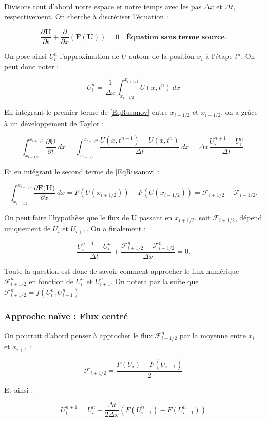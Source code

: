 \documentclass[
11pt, %
francais, %
singlespacing, %
headsepline, %
]{MastersDoctoralThesis} %
\theoremstyle{definition}
\begin{document}
Divisons tout d'abord notre espace et notre temps avec les pas $\Delta x$ et $\Delta t$, respectivement. On cherche à discrétiser l'équation : 

$$\frac{\partial\textbf{U}}{\partial t}+\frac{\partial}{\partial x}(\textbf{F} (\textbf{U})) = 0 \quad \textbf{Équation sans terme source} \label{EqRusanov} .$$

On pose ainsi $U_i ^n$ l'approximation de $U$ autour de la position $x_i$ à l'étape $t^n$. On peut donc noter :

$$ U_i ^n = \frac{1}{\Delta x}\int_{x_{i-1/2}}^{x_{i+1/2}} U(x,t^n) \ dx $$

En intégrant le premier terme de \ref{EqRusanov} entre $x_{i-1/2}$ et $x_{i+1/2}$, on a grâce à un développement de Taylor :

$$ \int_{x_{i-1/2}}^{x_{i+1/2}} \frac{\partial\textbf{U}}{\partial t} \ dx = \int_{x_{i-1/2}}^{x_{i+1/2}} \frac{U(x,t^{n+1}) - U(x,t^{n})}{\Delta t} \ dx = \Delta x \frac{ U_i ^{n+1} - U_i ^{n}}{\Delta t} .$$

Et en intégrant le second terme de \ref{EqRusanov} : 

$$ \int_{x_{i-1/2}}^{x_{i+1/2}} \frac{\partial\textbf{F(U)}}{\partial x} \ dx = F(U(x_{i+1/2})) - F(U(x_{i-1/2} )) = \mathcal{F}_{i+1/2} - \mathcal{F}_{i-1/2}.$$

On peut faire l'hypothèse que le flux de U passant en $x_{i+1/2}$, soit $\mathcal{F}_{i+1/2}$, dépend uniquement de $U_i$ et $U_{i+1}$. On a finalement :

$$ \frac{ U_i ^{n+1} - U_i ^{n}}{\Delta t} + \frac{ \mathcal{F}_{i+1/2} ^n - \mathcal{F}_{i-1/2} ^{n} }{\Delta x} = 0.$$

Toute la question est donc de savoir comment approcher le flux numérique $\mathcal{F}_{i+1/2} ^{n}$ en fonction de $U_i ^n$ et $U_{i+1} ^n$. On notera par la suite que $\mathcal{F}_{i+1/2} ^{n} = f(U_i ^n , U_{i+1} ^n)$

\subsubsection{Approche naïve : Flux centré }

On pourrait d'abord penser à approcher le flux $\mathcal{F}_{i+1/2} ^{n}$ par la moyenne entre $x_i$ et $x_{i+1}$ :
 
$$ \mathcal{F}_{i+1/2} = \frac{F(U_i) + F(U_{i+1})}{2} $$
 
Et ainsi :

$$ U_i ^{n+1} = U_i ^{n}  - \frac{\Delta t}{2 \Delta x} (F(U_{i+1} ^{n}) - F(U_{i-1} ^{n} )) $$
\end{document}

